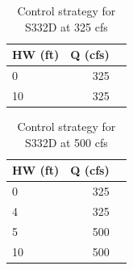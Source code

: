 \footnotesize
\begin{table}[!h]
\centering
\caption{Control strategy for S332D at 325 cfs}
\label{tab:CS-S332D-325}
\begin{tabular}{l|rr}
\hline
\textbf{HW (ft)} &  \textbf{Q (cfs)} \\
\hline
0        &    325  \\
10       &    325  \\
\hline
\end{tabular}
\end{table}
\normalsize

\footnotesize
\begin{table}[!h]
\centering
\caption{Control strategy for S332D at 500 cfs}
\label{tab:CS-S332D-500}
\begin{tabular}{l|rr}
\hline
\textbf{HW (ft)} &  \textbf{Q (cfs)} \\
\hline
0        &    325  \\
4        &    325  \\
5        &    500  \\
10       &    500  \\
\hline
\end{tabular}
\end{table}
\normalsize

\clearpage



%
%

